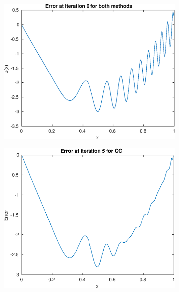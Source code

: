 \documentclass{article}
\begin{document}
\begin{figure}[H]
\begin{subfigure}{0.495\linewidth}
        \includegraphics[width=\linewidth]{initialerr.eps}
    \end{subfigure}
    \begin{subfigure}{0.495\linewidth}
        \centering
        \includegraphics[width=\linewidth]{CGerr_i=5.eps}
    \end{subfigure}
    \begin{subfigure}{0.495\linewidth}
        \centering

\end{subfigure}
\end{figure}
\end{document}
